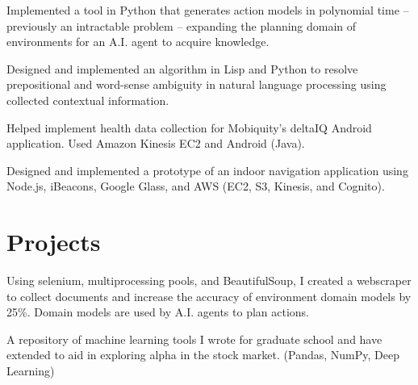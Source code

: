 \documentclass[]{deedy-resume-openfont}
\begin{document}
\begin{minipage}[t]{0.66\textwidth}
\begin{tightemize}
\item Implemented a tool in Python that generates action models in polynomial time -- previously an intractable problem -- expanding the planning domain of environments for an A.I. agent to acquire knowledge.

\item Designed and implemented an algorithm in Lisp and Python to resolve prepositional and word-sense ambiguity in natural language processing using collected contextual information.
\end{tightemize}
\sectionsep

\begin{tightemize}
\item Helped implement health data collection for Mobiquity’s deltaIQ Android application. Used Amazon Kinesis EC2 and Android (Java).

\item Designed and implemented a prototype of an indoor navigation application using Node.js, iBeacons, Google Glass, and AWS (EC2, S3, Kinesis, and Cognito).
\end{tightemize}


\section{Projects}

\begin{tightemize}
\item Using selenium, multiprocessing pools, and BeautifulSoup, I created a webscraper to collect documents and increase the accuracy of environment domain models by 25\%. Domain models are used by A.I. agents to plan actions.
\end{tightemize}

\begin{tightemize}
\item A repository of machine learning tools I wrote for graduate school and have extended to aid in exploring alpha in the stock market. (Pandas, NumPy, Deep Learning)
\end{tightemize}


\end{minipage}
\end{document}
